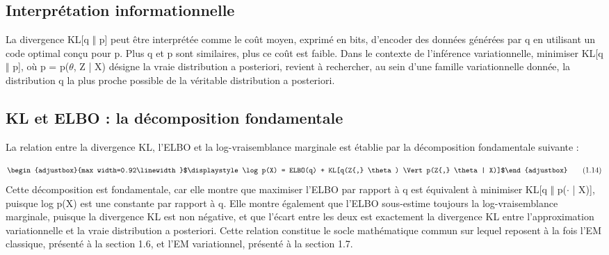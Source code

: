 \subsection{Interprétation informationnelle}
La divergence KL[q $\Vert $ p] peut être interprétée comme le coût moyen, exprimé en bits, d'encoder des données générées par q en utilisant un code optimal conçu pour p. Plus q et p sont similaires, plus ce coût est faible. Dans le contexte de l'inférence variationnelle, minimiser KL[q $\Vert $ p], où p = p($\theta $, Z | X) désigne la vraie distribution a posteriori, revient à rechercher, au sein d'une famille variationnelle donnée, la distribution q la plus proche possible de la véritable distribution a posteriori.

\subsection{KL et ELBO : la décomposition fondamentale}
La relation entre la divergence KL, l'ELBO et la log-vraisemblance marginale est établie par la décomposition fondamentale suivante :

\begin{equation}
\begin{adjustbox}{max width=0.92\linewidth}$\displaystyle \log  p(X) = ELBO(q) + KL[q(Z{,} \theta ) \Vert  p(Z{,} \theta  | X)]$\end{adjustbox}
\tag{1.14}
\label{eq:1_14}
\end{equation}
Cette décomposition est fondamentale, car elle montre que maximiser l'ELBO par rapport à q est équivalent à minimiser KL[q $\Vert $ p($\cdot $ | X)], puisque log p(X) est une constante par rapport à q. Elle montre également que l'ELBO sous-estime toujours la log-vraisemblance marginale, puisque la divergence KL est non négative, et que l'écart entre les deux est exactement la divergence KL entre l'approximation variationnelle et la vraie distribution a posteriori. Cette relation constitue le socle mathématique commun sur lequel reposent à la fois l'EM classique, présenté à la section 1.6, et l'EM variationnel, présenté à la section 1.7.

